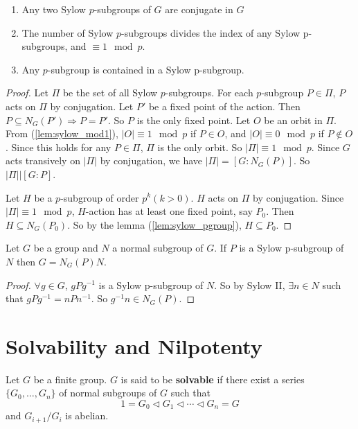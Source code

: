\documentclass[12pt]{book}
\begin{document}
	\begin{theorem}[Sylow II]
		\begin{enumerate}
			\item Any two Sylow $p$-subgroups of $G$ are conjugate in $G$
			\item The number of Sylow $p$-subgroups divides the index of any Sylow p-subgroups, and $\equiv 1\mod p$.
			\item Any $p$-subgroup is contained in a Sylow p-subgroup.
		\end{enumerate}
	\end{theorem}
	\begin{proof}
		Let $\Pi$ be the set of all Sylow $p$-subgroups. For each $p$-subgroup $P\in \Pi$, $P$ acts on $\Pi$ by conjugation. Let $P'$ be a fixed point of the action. Then $P\subseteq N_G(P')\Rightarrow P=P'$. So $P$ is the only fixed point. Let $O$ be an orbit in $\Pi$. From (\ref{lem:sylow_mod1}), $|O|\equiv 1 \mod p$ if $P\in O$, and $|O|\equiv 0 \mod p$ if $P\not\in O$. Since this holds for any $P\in\Pi$, $\Pi$ is the only orbit. So $|\Pi|\equiv 1 \mod p$. Since $G$ acts transively on $|\Pi|$ by conjugation, we have $|\Pi|=[G:N_G(P)]$. So $|\Pi|\big| [G:P]$.
		
		Let $H$ be a $p$-subgroup of order $p^k (k>0)$. $H$ acts on $\Pi$ by conjugation. Since $|\Pi|\equiv 1 \mod p$, $H$-action has at least one fixed point, say $P_0$. Then $H\subseteq N_G(P_0)$. So by the lemma (\ref{lem:sylow_pgroup}), $H\subseteq P_0$.
	\end{proof}
	
	\begin{corollary}
		Let $G$ be a group and $N$ a normal subgroup of $G$. If $P$ is a Sylow p-subgroup of $N$ then $G=N_G(P)N$.
	\end{corollary}
	\begin{proof}
		$\forall g\in G$, $gPg^{-1}$ is a Sylow p-subgroup of $N$. So by Sylow II, $\exists n\in N$ such that $gPg^{-1}=nPn^{-1}$. So $g^{-1}n\in N_G(P)$.
	\end{proof}

	\section{Solvability and Nilpotenty}
	
	\begin{definition}
		Let $G$ be a finite group. $G$ is said to be {\bf solvable} if there exist a series $\{G_0,\dots,G_n\}$ of normal subgroups of $G$ such that 
		\begin{equation}
			1=G_0\triangleleft G_1\triangleleft\cdots\triangleleft G_n= G
		\end{equation}
		and $G_{i+1}/G_i$ is abelian.
	\end{definition}
	
\end{document}
